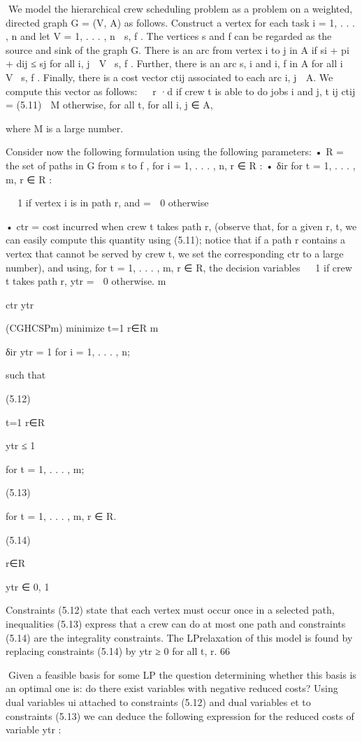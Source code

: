 We model the hierarchical crew scheduling problem as a problem on a weighted, directed graph G = (V, A)
as follows. Construct a vertex for each task i = 1, . . . , n and let V = {1, . . . , n} ∪ {s, f }. The vertices s
and f can be regarded as the source and sink of the graph G. There is an arc from vertex i to j in A if
si + pi + dij ≤ sj for all i, j ∈ V \ {s, f }. Further, there is an arc {s, i} and {i, f } in A for all i ∈ V \ {s, f }.
Finally, there is a cost vector ctij associated to each arc {i, j} ∈ A. We compute this vector as follows:

 r ·d
if crew t is able to do jobs i and j,
t
ij
ctij =
(5.11)
 M
otherwise, for all t, for all {i, j} ∈ A,

where M is a large number.

Consider now the following formulation using the following parameters:
• R = the set of paths in G from s to f ,
for i = 1, . . . , n, r ∈ R :
• δir
for t = 1, . . . , m, r ∈ R :


 1 if vertex i is in path r, and
=
 0 otherwise

• ctr = cost incurred when crew t takes path r, (observe that, for a given r, t, we can easily compute
this quantity using (5.11); notice that if a path r contains a vertex that cannot be served by crew t, we
set the corresponding ctr to a large number),
and using, for t = 1, . . . , m, r ∈ R, the decision variables

 1 if crew t takes path r,
ytr =
 0 otherwise.
m

ctr ytr

(CGHCSPm) minimize
t=1 r∈R
m

δir ytr = 1 for i = 1, . . . , n;

such that

(5.12)

t=1 r∈R

ytr ≤ 1

for t = 1, . . . , m;

(5.13)

for t = 1, . . . , m, r ∈ R.

(5.14)

r∈R

ytr ∈ {0, 1}

Constraints (5.12) state that each vertex must occur once in a selected path, inequalities (5.13) express
that a crew can do at most one path and constraints (5.14) are the integrality constraints. The LPrelaxation of this model is found by replacing constraints (5.14) by ytr ≥ 0 for all t, r.
66

Given a feasible basis for some LP the question determining whether this basis is an optimal one is: do
there exist variables with negative reduced costs? Using dual variables ui attached to constraints (5.12)
and dual variables et to constraints (5.13) we can deduce the following expression for the reduced costs
of variable ytr :

